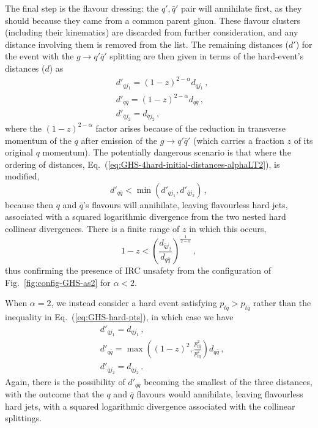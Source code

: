 \documentclass[nofootinbib,twocolumn,preprintnumbers,superscriptaddress,aps]{revtex4-2}
\newcommand{\nohat}{}
\begin{document}
The final step is the flavour dressing:
the $\nohat{q}', \nohat{\bar{q}}'$ pair will annihilate first, as they should
because they came from a common parent gluon.
%
These flavour clusters (including their kinematics) are discarded from
further consideration, and any distance involving them is removed from
the list.
%
The remaining distances ($d'$) for the event with the
$g\to q' \bar q'$ splitting are then given in terms of the
hard-event's distances ($d$) as
%
\begin{subequations}
  \begin{align}
    &d'_{\nohat{q}j_1} = (1 - z)^{2-\alpha} d_{\nohat{q}j_1}\,, \\
    &d'_{\nohat{q}\nohat{\bar{q}}} = (1 - z)^{2-\alpha} d_{\nohat{q}\nohat{\bar{q}}}\,, \\
    &d'_{\nohat{\bar{q}} j_2} = d_{\nohat{\bar{q}}j_2}\,,
  \end{align}
\end{subequations}
where the $(1-z)^{2-\alpha}$ factor arises because of the reduction in
transverse momentum of the $q$ after emission of the $g\to q'\bar q'$
(which carries a fraction $z$ of its original $q$ momentum).
%
The potentially dangerous scenario is that where the ordering of
distances, Eq.~(\ref{eq:GHS-4hard-initial-distances-alphaLT2}), is
modified,
\begin{equation}
  \label{eq:GHS-4hard-danger}
  d'_{\nohat{q}\nohat{\bar{q}}} < \min\left(d'_{\nohat{q}j_1},d'_{\nohat{\bar{q}} j_2}\right)\,,
\end{equation}
because then $q$ and $\bar q$'s flavours will annihilate, leaving
flavourless hard jets, associated with a squared logarithmic
divergence from the two nested hard collinear divergences.
%
There is a finite range of $z$ in which this occurs,
\begin{equation}
  \label{eq:GHS-alpha-less2-z}
  1-z < 
      \left(\frac{d_{\nohat{\bar{q}}j_2}}{d_{\nohat{q}\nohat{\bar{q}}}}\right)^{\frac{1}{2
      - \alpha}}\,,
\end{equation}
thus confirming the presence of IRC unsafety from the configuration of
Fig.~\ref{fig:config-GHS-as2} for $\alpha<2$.


When $\alpha = 2$, we instead consider a hard event satisfying
$p_{tq} > p_{t\bar{q}}$ rather than the inequality in
Eq.~(\ref{eq:GHS-hard-pts}), in which case we have
%
\begin{subequations}
  \begin{align}
    &d'_{\nohat{q}j_1} = d_{\nohat{q}j_1}\,, \\
    &d'_{\nohat{q}\nohat{\bar{q}}} = \max\left((1 -
      z)^{2},\frac{p_{t\bar q}^2}{p_{tq}^2}\right)
      d_{\nohat{q}\nohat{\bar{q}}}\,,
    \\
    &d'_{\nohat{\bar{q}} j_2} = d_{\nohat{\bar{q}}j_2}\,.
  \end{align}
\end{subequations}
%
Again, there is the possibility of $d'_{\nohat{q}\nohat{\bar{q}}}$
becoming the smallest of the three distances, with the outcome that
the $q$ and $\bar q$ flavours would annihilate, leaving flavourless
hard jets, with a squared logarithmic divergence associated with the
collinear splittings. 
\end{document}
